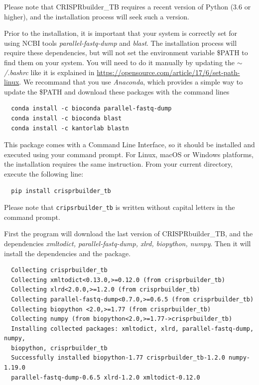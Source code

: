 \documentclass[twoside,a4paper,11pt,frenchb,openany]{report}
\begin{document}
Please note that CRISPRbuilder\_TB requires a recent version of Python (3.6 or higher), and the installation process will seek such a version.

Prior to the installation, it is important that your system is correctly set for using NCBI tools \textit{parallel-fastq-dump} and \textit{blast}. The installation process will require these dependencies, but will not set the environment variable \$PATH to find them on your system. You will need to do it manually by updating the \textit{$\sim$/.bashrc} like it is explained in \url{https://opensource.com/article/17/6/set-path-linux}. We recommand that you use \textit{Anaconda}, which provides a simple way to update the \$PATH and download these packages with the command lines

\begin{verbatim}
  conda install -c bioconda parallel-fastq-dump
  conda install -c bioconda blast
  conda install -c kantorlab blastn
\end{verbatim}

    This package comes with a Command Line Interface, so it should be
installed and executed using your command prompt. For Linux, macOS or
Windows platforms, the installation requires the same instruction. From your current directory, execute the following line:

    \begin{verbatim}
  pip install crisprbuilder_tb
\end{verbatim}

    Please note that \texttt{cripsrbuilder\_tb} is written without capital
letters in the command prompt.

First the program will download the last version of CRISPRbuilder\_TB, and the dependencies \textit{xmltodict, parallel-fastq-dump, xlrd, biopython, numpy}. Then it will install the dependencies and the package.

\begin{verbatim}  Collecting crisprbuilder_tb
  Collecting xmltodict<0.13.0,>=0.12.0 (from crisprbuilder_tb)
  Collecting xlrd<2.0.0,>=1.2.0 (from crisprbuilder_tb)
  Collecting parallel-fastq-dump<0.7.0,>=0.6.5 (from crisprbuilder_tb)
  Collecting biopython <2.0,>=1.77 (from crisprbuilder_tb)
  Collecting numpy (from biopython<2.0,>=1.77->crisprbuilder_tb)
  Installing collected packages: xmltodict, xlrd, parallel-fastq-dump, numpy, 
  biopython, crisprbuilder_tb
  Successfully installed biopython-1.77 crisprbuilder_tb-1.2.0 numpy-1.19.0 
  parallel-fastq-dump-0.6.5 xlrd-1.2.0 xmltodict-0.12.0
\end{verbatim}
\end{document}
